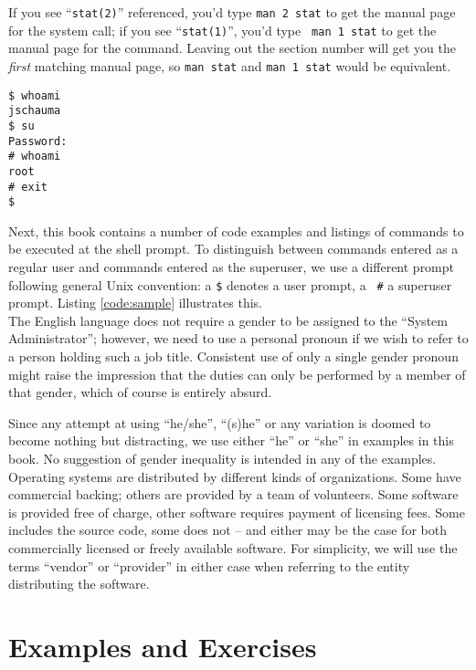 If you see ``{\tt stat(2)}'' referenced, you'd type
{\tt man 2 stat} to get the manual page for the system
call; if you see ``{\tt stat(1)}'', you'd type {\tt
man 1 stat} to get the manual page for the command.
Leaving out the section number will get you the {\em
first} matching manual page, so {\tt man stat} and
{\tt man 1 stat} would be equivalent.

\begin{lstlisting}[float,label=code:sample,caption=Sample command-line invocations]
$ whoami
jschauma
$ su
Password:
# whoami
root
# exit
$
\end{lstlisting}

Next, this book contains a number of code examples and
listings of commands to be executed at the shell
prompt.  To distinguish between commands entered as a
regular user and commands entered as the superuser, we
use a different prompt following general Unix
convention: a {\tt \$} denotes a user prompt, a {\tt
\#} a superuser prompt.  Listing \ref{code:sample}
illustrates this. \\

The English language does not require a gender to be
assigned to the ``System Administrator''; however, we
need to use a personal pronoun if we wish to refer to
a person holding such a job title.  Consistent use of
only a single gender pronoun might raise the
impression that the duties can only be performed by a
member of that gender, which of course is entirely
absurd.

Since any attempt at using ``he/she'', ``(s)he'' or
any variation is doomed to become nothing but
distracting, we use either ``he'' or ``she'' in
examples in this book.  No suggestion of gender
inequality is intended in any of the examples. \\

Operating systems are distributed by different kinds
of organizations.  Some have commercial backing;
others are provided by a team of volunteers.  Some
software is provided free of charge, other software
requires payment of licensing fees.  Some includes the
source code, some does not -- and either may be the
case for both commercially licensed or freely
available software.  For simplicity, we will use the
terms ``vendor'' or ``provider'' in either case when
referring to the entity distributing the software.

\section*{Examples and Exercises}

